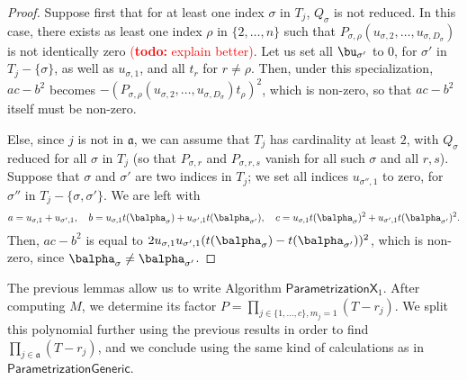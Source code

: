 \documentclass[12pt]{article}
\newcommand{\todo}[1]{\textcolor{red}{({\bf todo:} #1)}}
\begin{document}
\begin{proof}
	Suppose first that for at least one index $\sigma$ in $T_j$,
	$Q_\sigma$ is not reduced. In this case, there exists as least one
	index $\rho$ in $\{2,\dots,n\}$ such that
	$P_{\sigma,\rho}(u_{\sigma,2},\dots,u_{\sigma,D_\sigma})$ is not
	identically zero \todo{explain better}. Let us set all $\bu_{\sigma'}$
	to $0$, for $\sigma'$ in $T_j-\{\sigma\}$, as well as $u_{\sigma,1}$,
	and all $t_r$ for $r\ne \rho$. Then, under this specialization,
	$ac-b^2$ becomes
	$-(P_{\sigma,\rho}(u_{\sigma,2},\dots,u_{\sigma,D_\sigma})t_\rho)^2$,
	which is non-zero, so that $ac-b^2$ itself must be non-zero.
	
	Else, since $j$ is not in $\mathfrak{a}$, we can assume that $T_j$
	has cardinality at least $2$, with $Q_\sigma$ reduced for all $\sigma$
	in $T_j$ (so that $P_{\sigma,r}$ and $P_{\sigma,r,s}$ vanish for 
	all such $\sigma$ and all $r,s$). Suppose that $\sigma$ and $\sigma'$ are two indices in
	$T_j$; we set all indices $u_{\sigma'',1}$ to zero, for $\sigma''$
	in $T_j-\{\sigma,\sigma'\}$. We are left with
	$$
	a=u_{\sigma,1}+u_{\sigma',1},\quad
	b=u_{\sigma,1}t(\balpha_{\sigma})+u_{\sigma',1}t(\balpha_{\sigma'}),\quad
	c=u_{\sigma,1}t(\balpha_{\sigma})^2+u_{\sigma',1}t(\balpha_{\sigma'})^2.
	$$
	Then, $ac-b^2$ is equal to $2u_{\sigma,1}u_{\sigma',1}(t(\balpha_{\sigma})-t(\balpha_{\sigma'}))^2$,
	which is non-zero, since $\balpha_\sigma \ne \balpha_{\sigma'}$.
\end{proof}

The previous lemmas allow us to write Algorithm
$\mathsf{ParametrizationX}_1$. After computing $M$, we determine its
factor $P=\prod_{j \in \{1,\dots,c\}, m_j=1} (T-r_j)$. We split this
polynomial further using the previous results in order to find
$\prod_{j \in \mathfrak{a}} (T-r_j)$, and we conclude using the same
kind of calculations as in $\mathsf{ParametrizationGeneric}$.
\end{document}
